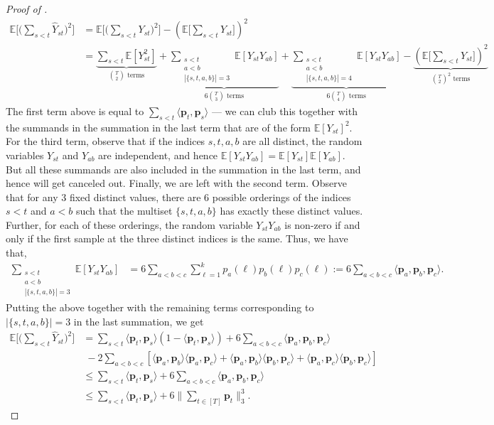 \documentclass[10pt]{article} %
\newcommand{\E}{\mathbb{E}}
\theoremstyle{plain}
\newcommand{\bp}{\textbf{p}}
\begin{document}
\begin{proof}[Proof of ]
	\begin{align}
		\E\Big[\Big(\sum_{s < t}\hat{Y}_{st}\Big)^2\Big] %
		&= \E\Big[\Big(\sum_{s < t}Y_{st}\Big)^2\Big] - \left(\E\Big[\sum_{s < t}Y_{st}\Big]\right)^2 \nonumber \\
		&= \underbrace{\sum_{s < t}\E\left[Y_{st}^2\right]}_{\text{$\binom{T}{2}$ terms}} + \underbrace{\sum_{\substack{s<t \\ a<b \\ |\{s,t,a,b\}|=3}} \E[{Y}_{st}{Y}_{ab}]}_{\text{$6\binom{T}{3}$ terms}} + \underbrace{\sum_{\substack{s<t \\ a<b \\ |\{s,t,a,b\}|=4}} \E[{Y}_{st}{Y}_{ab}]}_{\text{$6\binom{T}{4}$ terms}} - \underbrace{\left(\E\Big[\sum_{s < t}Y_{st}\Big]\right)^2}_{\text{$\binom{T}{2}^2$ terms}} 
	\end{align}
	The first term above is equal to $\sum_{s < t}\langle \bp_t, \bp_{s} \rangle$ --- we can club this together with the summands in the summation in the last term that are of the form $\E[Y_{st}]^2$. For the third term, observe that if the indices $s,t,a,b$ are all distinct, the random variables ${Y}_{st}$ and ${Y}_{ab}$ are independent, and hence $\E[{Y}_{st}{Y}_{ab}]=\E[{Y}_{st}]\E[{Y}_{ab}]$. But all these summands are also included in the summation in the last term, and hence will get canceled out. Finally, we are left with the second term. Observe that for any 3 fixed distinct values, there are 6 possible orderings of the indices $s<t$ and $a<b$ such that the multiset $\{s,t,a,b\}$ has exactly these distinct values. Further, for each of these orderings, the random variable ${Y}_{st}{Y}_{ab}$ is non-zero if and only if the first sample at the three distinct indices is the same. Thus, we have that,
	\begin{align}\label{eq:thm15}
		\sum_{\substack{s<t \\ a<b \\ |\{s,t,a,b\}|=3}} \E[{Y}_{st}{Y}_{ab}] &= 
		6\sum_{a < b < c}\sum_{\ell=1}^k p_a(\ell) p_b(\ell) p_c(\ell) := 6\sum_{a < b < c} \langle \bp_a, \bp_b, \bp_c \rangle.
	\end{align}
	Putting the above together with the remaining terms corresponding to $|\{s,t,a,b\}|=3$ in the last summation, we get
	\begin{align}
		\E\Big[\Big(\sum_{s < t}\hat{Y}_{st}\Big)^2\Big] &= \sum_{s < t}\langle \bp_t, \bp_{s}\rangle(1-\langle \bp_t, \bp_{s}\rangle) + 6\sum_{a < b < c} \langle \bp_a, \bp_b, \bp_c \rangle \nonumber \\
		&\;- 2\sum_{a < b < c}[\langle \bp_a, \bp_{b}\rangle\langle \bp_a, \bp_{c}\rangle+\langle \bp_a, \bp_{b}\rangle\langle \bp_b, \bp_{c}\rangle+\langle \bp_a, \bp_{c}\rangle\langle \bp_b, \bp_{c}\rangle] \label{eqn:hurdle1}\\
		&\le \sum_{s < t}\langle \bp_t, \bp_{s}\rangle + 6\sum_{a < b < c} \langle \bp_a, \bp_b, \bp_c \rangle \label{eqn:hurdle2}\\
		&\le \sum_{s < t}\langle \bp_t, \bp_{s}\rangle + 6 \Big\| \sum_{t \in [T]} \bp_t\Big\|^3_3. \nonumber
	\end{align}
	

\end{proof}
\end{document}
